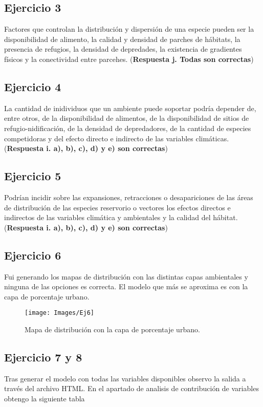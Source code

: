 \subsection{Ejercicio 3}
Factores que controlan la distribución y dispersión de una especie pueden ser la disponibilidad de alimento, la calidad y densidad de parches de hábitats, la presencia de refugios, la densidad de depredades, la existencia de gradientes físicos y la conectividad entre parcehes. (\textbf{Respuesta j. Todas son correctas})

\subsection{Ejercicio 4}
La cantidad de inidividuos que un ambiente puede soportar podría depender de, entre otros, de la disponibilidad de alimentos, de la disponibilidad de sitios de refugio-nidificación, de la densidad de depredadores, de la cantidad de especies competidoras y del efecto directo e indirecto de las variables climáticas. (\textbf{Respuesta i. a), b), c), d) y e) son correctas})

\subsection{Ejercicio 5}
Podrían incidir sobre las expansiones, retracciones o desapariciones de las áreas de distribución de las especies reservorio o vectores los efectos directos e indirectos de las variables climática y ambientales y la calidad del hábitat. (\textbf{Respuesta i. a), b), c), d) y e) son correctas})

\subsection{Ejercicio 6}
Fui generando los mapas de distribución con las distintas capas ambientales y ninguna de las opciones es correcta. El modelo que más se aproxima es con la capa de porcentaje urbano.

\begin{figure}[H]
	\centering
	\texttt{[image: Images/Ej6]}
	\caption{Mapa de distribución con la capa de porcentaje urbano.}
	\label{fig:ej6}
\end{figure}

\subsection{Ejercicio 7 y 8}
Tras generar el modelo con todas las variables disponibles observo la salida a través del archivo HTML. En el apartado de analisis de contribución de variables obtengo la siguiente tabla

